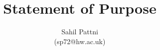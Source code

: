\documentclass[a4paper,11pt]{article}
\newcommand{\program}{Master of Science in Computer Science}
\newcommand{\supervisor}{\textbf{Professor Neamat El Gayar}}
\begin{document}
\title{Statement of Purpose}

\author{Sahil Pattni\\(sp72@hw.ac.uk)}
\date{}
\maketitle



\end{document}
